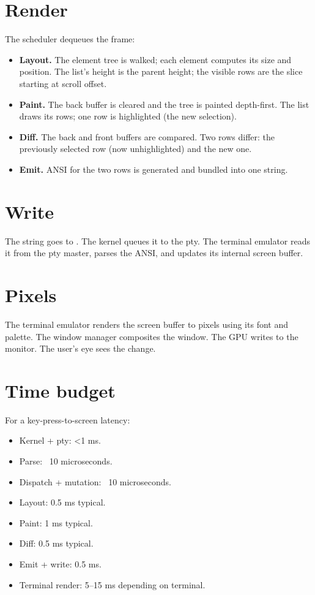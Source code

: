 \section{Render}

The scheduler dequeues the frame:

\begin{itemize}[leftmargin=*]
  \item \textbf{Layout.} The element tree is walked; each
    element computes its size and position. The list's height
    is the parent height; the visible rows are the slice
    starting at scroll offset.
  \item \textbf{Paint.} The back buffer is cleared and the
    tree is painted depth-first. The list draws its rows;
    one row is highlighted (the new selection).
  \item \textbf{Diff.} The back and front buffers are
    compared. Two rows differ: the previously selected row
    (now unhighlighted) and the new one.
  \item \textbf{Emit.} ANSI for the two rows is generated and
    bundled into one string.
\end{itemize}

\section{Write}

The string goes to . The kernel queues it
to the pty. The terminal emulator reads it from the pty
master, parses the ANSI, and updates its internal screen
buffer.

\section{Pixels}

The terminal emulator renders the screen buffer to pixels
using its font and palette. The window manager composites the
window. The GPU writes to the monitor. The user's eye sees
the change.

\section{Time budget}

For a key-press-to-screen latency:

\begin{itemize}[leftmargin=*]
  \item Kernel + pty: <1 ms.
  \item Parse: ~10 microseconds.
  \item Dispatch + mutation: ~10 microseconds.
  \item Layout: 0.5 ms typical.
  \item Paint: 1 ms typical.
  \item Diff: 0.5 ms typical.
  \item Emit + write: 0.5 ms.
  \item Terminal render: 5--15 ms depending on terminal.
\end{itemize}

